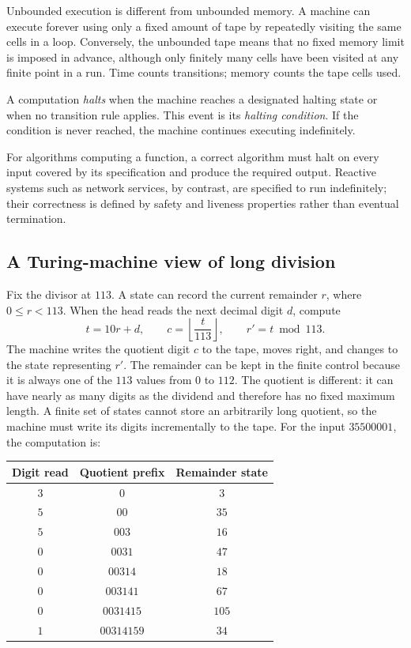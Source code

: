 \documentclass[11pt]{article}
\begin{document}
Unbounded execution is different from unbounded memory. A machine can execute
forever using only a fixed amount of tape by repeatedly visiting the same cells
in a loop. Conversely, the unbounded tape means that no fixed memory limit is
imposed in advance, although only finitely many cells have been visited at any
finite point in a run. Time counts transitions; memory counts the tape cells used.

\begin{definition}[Halting]
A computation \emph{halts} when the machine reaches a designated halting state
or when no transition rule applies. This event is its \emph{halting condition}.
If the condition is never reached, the machine continues executing indefinitely.
\end{definition}

For algorithms computing a function, a correct algorithm must halt on every
input covered by its specification and produce the required output. Reactive
systems such as network services, by contrast, are specified to run
indefinitely; their correctness is defined by safety and liveness properties
rather than eventual termination.

\subsection{A Turing-machine view of long division}

Fix the divisor at $113$. A state can record the current remainder $r$, where $0\le r<113$. When the head reads the next decimal digit $d$, compute
\[
  t=10r+d,\qquad c=\left\lfloor\frac{t}{113}\right\rfloor,
  \qquad r'=t\bmod113.
\]
The machine writes the quotient digit $c$ to the tape, moves right, and changes
to the state representing $r'$. The remainder can be kept in the finite control
because it is always one of the $113$ values from $0$ to $112$. The quotient is
different: it can have nearly as many digits as the dividend and therefore has
no fixed maximum length. A finite set of states cannot store an arbitrarily long
quotient, so the machine must write its digits incrementally to the tape. For the
input $35500001$, the computation is:

\begin{center}
\small
\begin{tabular}{c@{\qquad}c@{\qquad}c}
\toprule
Digit read & Quotient prefix & Remainder state \\
\midrule
$3$ & $0$ & $3$ \\
$5$ & $00$ & $35$ \\
$5$ & $003$ & $16$ \\
$0$ & $0031$ & $47$ \\
$0$ & $00314$ & $18$ \\
$0$ & $003141$ & $67$ \\
$0$ & $0031415$ & $105$ \\
$1$ & $00314159$ & $34$ \\
\bottomrule
\end{tabular}
\end{center}
\end{document}

